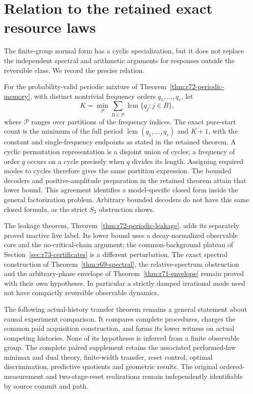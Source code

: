 \section{Relation to the retained exact resource laws}
\label{sec:r73-consequences}
The finite-group normal form has a cyclic specialization, but it does not
replace the independent spectral and arithmetic arguments for responses
outside the reversible class. We record the precise relation.

For the probability-valid periodic mixture of
Theorem~\ref{thm:r72-periodic-memory}, with distinct nontrivial frequency
orders $q_1,\ldots,q_r$, let
\[
 K=\min_{\mathcal P}\sum_{B\in\mathcal P}
                  \operatorname{lcm}\{q_j:j\in B\},
\]
where $\mathcal P$ ranges over partitions of the frequency indices.
The exact pure-start count is the minimum of the full period
$\operatorname{lcm}(q_1,\ldots,q_r)$ and $K+1$, with the constant and
single-frequency endpoints as stated in the retained theorem.
A cyclic permutation representation is a disjoint union of cycles; a
frequency of order $q$ occurs on a cycle precisely when $q$ divides its
length. Assigning required modes to cycles therefore gives the same
partition expression. The bounded decoders and positive-amplitude
preparation in the retained theorem attain that lower bound. This agreement
identifies a model-specific closed form inside the general factorization
problem. Arbitrary bounded decoders do not have this same closed formula,
as the strict $S_3$ obstruction shows.

The leakage theorem, Theorem~\ref{thm:r72-periodic-leakage}, adds its
separately proved inactive live label. Its lower bound uses a
decay-normalized observable core and the no-critical-chain argument;
the common-background plateau of Section~\ref{sec:r73-certificates}
is a different perturbation. The exact spectral construction of
Theorem~\ref{thm:r69-spectral}, the relative-spectrum obstruction and
the arbitrary-phase envelope of Theorem~\ref{thm:r71-envelope} remain
proved with their own hypotheses. In particular a strictly damped
irrational mode need not have compactly reversible observable dynamics.

The following actual-history transfer theorem remains a general statement
about causal experiment comparison. It compares complete procedures,
charges the common paid acquisition construction, and forms its lower
witness on actual competing histories. None of its hypotheses is inferred
from a finite observable group. The complete paired supplement retains the
associated performed-law minimax and dual theory, finite-width transfer,
reset control, optimal discrimination, predictive quotients and geometric
results. The original ordered-measurement and two-stage-reset realizations
remain independently identifiable by source commit and path.
